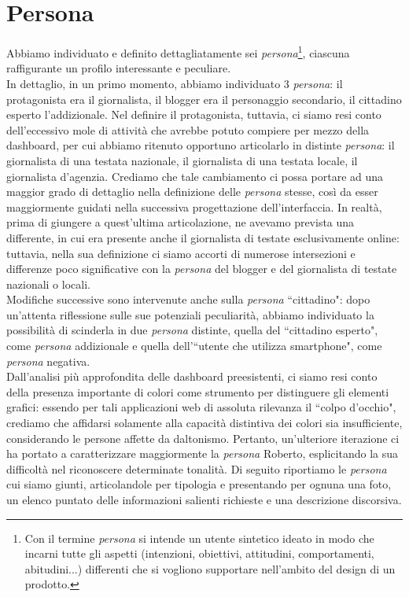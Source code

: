 \section{Persona}
Abbiamo individuato e definito dettagliatamente sei \textit{persona}\footnote{Con il termine \textit{persona} si intende un utente sintetico ideato in modo che incarni tutte gli aspetti (intenzioni, obiettivi, attitudini, comportamenti, abitudini...) differenti che si vogliono supportare nell'ambito del design di un prodotto.}, ciascuna raffigurante un profilo interessante e peculiare.\\
In dettaglio, in un primo momento, abbiamo individuato 3 \textit{persona}: il protagonista era il giornalista, il blogger era il personaggio secondario, il cittadino esperto l'addizionale. Nel definire il protagonista, tuttavia, ci siamo resi conto dell'eccessivo mole di attività che avrebbe potuto compiere per mezzo della dashboard, per cui abbiamo ritenuto opportuno articolarlo in distinte \textit{persona}: il giornalista di una testata nazionale, il giornalista di una testata locale, il giornalista d'agenzia. Crediamo che tale cambiamento ci possa portare ad una maggior grado di dettaglio nella definizione delle \textit{persona} stesse, così da esser maggiormente guidati nella successiva progettazione dell'interfaccia.
\noindent
In realtà, prima di giungere a quest'ultima articolazione, ne avevamo prevista una differente, in cui era presente anche il giornalista di testate esclusivamente online: tuttavia, nella sua definizione ci siamo accorti di numerose intersezioni e differenze poco significative con la \textit{persona} del blogger e del giornalista di testate nazionali o locali. \\ 
Modifiche successive sono intervenute anche sulla \textit{persona} ``cittadino": dopo un'attenta riflessione sulle sue potenziali peculiarità, abbiamo individuato la possibilità di scinderla in due \textit{persona} distinte, quella del ``cittadino esperto", come \textit{persona} addizionale e quella dell'``utente che utilizza smartphone", come \textit{persona} negativa.\\
Dall'analisi più approfondita delle dashboard preesistenti, ci siamo resi conto della presenza importante di colori come strumento per distinguere gli elementi grafici: essendo per tali applicazioni web di assoluta rilevanza il ``colpo d'occhio", crediamo che affidarsi solamente alla capacità distintiva dei colori sia insufficiente, considerando le persone affette da daltonismo. Pertanto, un'ulteriore iterazione ci ha portato a caratterizzare maggiormente la \textit{persona} Roberto, esplicitando la sua difficoltà nel riconoscere determinate tonalità.
\noindent
Di seguito riportiamo le \textit{persona} cui siamo giunti, articolandole per tipologia e presentando per ognuna una foto, un elenco puntato delle informazioni salienti richieste e una descrizione discorsiva.

